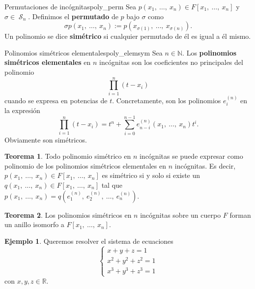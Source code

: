 \documentclass[a4paper]{book}
\theoremstyle{definition}
\newtheorem{theorem}{Teorema}[section]
\theoremstyle{ejemplo}
\newtheorem{ejem}{Ejemplo}[section]
\theoremstyle{demostracion}
\newcommand{\reales}{\mathbb{R}}
\newcommand{\naturales}{\mathbb{N}}
\newcommand{\incognitas}[1]{x_1,\ \ldots ,\ x_{#1}}
\newcommand{\incognitasperm}[2]{x_{#2(1)},\ \ldots ,\ x_{#2(#1)}}
\DeclareMathOperator{\simgroup}{\mathcal{S}}
\begin{document}
\begin{define}{Permutaciones de incógnitas}{poly_perm}
	Sea $p(\incognitas{n}) \in F[\incognitas{n}]$ y $\sigma \in \simgroup_n$. Definimos el \textbf{permutado} de $p$ bajo $\sigma$ como
	\begin{equation*}
		\sigma p (\incognitas{n}) := p(\incognitasperm{n}{\sigma}).
	\end{equation*}
	Un polinomio se dice \textbf{simétrico} si cualquier permutado de él es igual a él mismo.
\end{define}

\begin{define}{Polinomios simétricos elementales}{poly_elemsym}
	Sea $n \in \naturales$. Los \textbf{polinomios simétricos elementales} en $n$ incógnitas son los coeficientes no principales del polinomio
	\begin{equation*}
		\prod_{i = 1}^n (t - x_i)
	\end{equation*}
	cuando se expresa en potencias de $t$. Concretamente, son los polinomios $e^{(n)}_i$ en la expresión
	\begin{equation*}
		\prod_{i = 1}^n (t - x_i) = t^n + \sum_{i = 0}^{n-1} e^{(n)}_{n-i} (\incognitas{n})t^i. 
	\end{equation*}
	Obviamente son simétricos.
\end{define}

\begin{theorem}
	Todo polinomio simétrico en $n$ incógnitas se puede expresar como polinomio de los polinomios simétricos elementales en $n$ incógnitas. Es decir, $p(\incognitas{n}) \in F[\incognitas{n}]$ es simétrico si y solo si existe un $q(\incognitas{n}) \in F[\incognitas{n}]$ tal que $p(\incognitas{n}) = q(e^{(n)}_1,\ e^{(n)}_2,\ \ldots,\ e^{(n)}_n)$.
\end{theorem}

\begin{theorem}
	Los polinomios simétricos en $n$ incógnitas sobre un cuerpo $F$ forman un anillo isomorfo a $F[\incognitas{n}]$.
\end{theorem}

\begin{ejem}
	Queremos resolver el sistema de ecuaciones
	\begin{equation*}
		\left\lbrace
		\begin{array}{c}
			x + y + z = 1 \\
			x^2 + y^2 + z^2 = 1 \\
			x^3 + y^3 + z^3 = 1
		\end{array}
		\right.
	\end{equation*}
	con $x,y,z \in \reales$.
\end{ejem}
\end{document}
